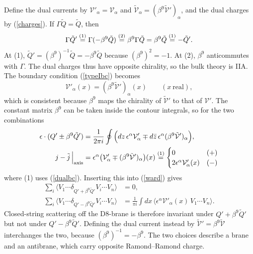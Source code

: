 \begin{tcolorbox}[breakable]
\begin{remark}
Define the dual currents by $\mathcal V'_\alpha = \mathcal V_\alpha$ and $\tilde{\mathcal V}_\alpha = (\beta^9\tilde{\mathcal V}')_\alpha$, and the dual charges by (\ref{charges}). If $\Gamma\tilde Q = \tilde Q$, then
\begin{align*}
\Gamma\tilde Q' \overset{(1)}{=} \Gamma(-\beta^9\tilde Q) \overset{(2)}{=} \beta^9\Gamma\tilde Q = \beta^9\tilde Q \overset{(1)}{=} -\tilde Q' .
\end{align*}
At (1), $\tilde Q' = (\beta^9)^{-1}\tilde Q = -\beta^9\tilde Q$ because $(\beta^9)^2=-1$. At (2), $\beta^9$ anticommutes with $\Gamma$. The dual charges thus have opposite chirality, so the bulk theory is IIA. The boundary condition (\ref{typeIbc}) becomes
\begin{equation}
\mathcal V'_\alpha(x) = (\beta^9\tilde{\mathcal V}')_\alpha(x) \qquad (x\ \text{real}),
\tag{D.6}\label{dualbc}
\end{equation}
which is consistent because $\beta^9$ maps the chirality of $\tilde{\mathcal V}'$ to that of $\mathcal V'$. The constant matrix $\beta^9$ can be taken inside the contour integrals, so for the two combinations
\begin{align*}
\epsilon\cdot(Q'\pm\beta^9\tilde Q') &= \frac{1}{2\pi i}\oint\Big(dz\,\epsilon^\alpha\mathcal V'_\alpha \mp d\bar z\,\epsilon^\alpha(\beta^9\tilde{\mathcal V}')_\alpha\Big),\\
j-\tilde j\,\Big|_{\rm axis} &= \epsilon^\alpha\big(\mathcal V'_\alpha \mp (\beta^9\tilde{\mathcal V}')_\alpha\big)(x) \overset{(1)}{=}
\begin{cases} 0 & (+)\\ 2\epsilon^\alpha\mathcal V'_\alpha(x) & (-)\end{cases}
\end{align*}
where (1) uses (\ref{dualbc}). Inserting this into (\ref{ward}) gives
\begin{align}
\sum_i\Big\langle V_1\cdots\delta_{Q'+\beta^9\tilde Q'}V_i\cdots V_n\Big\rangle &= 0, \tag{D.7}\label{susyward1}\\
\sum_i\Big\langle V_1\cdots\delta_{Q'-\beta^9\tilde Q'}V_i\cdots V_n\Big\rangle &= \frac{1}{\pi i}\int dx\,\Big\langle \epsilon^\alpha\mathcal V'_\alpha(x)\,V_1\cdots V_n\Big\rangle . \tag{D.8}\label{susyward2}
\end{align}
Closed-string scattering off the D8-brane is therefore invariant under $Q'+\beta^9\tilde Q'$ but not under $Q'-\beta^9\tilde Q'$. Defining the dual current instead by $\tilde{\mathcal V}' = \beta^9\tilde{\mathcal V}$ interchanges the two, because $(\beta^9)^{-1} = -\beta^9$. The two choices describe a brane and an antibrane, which carry opposite Ramond--Ramond charge.


\end{remark}
\end{tcolorbox}
